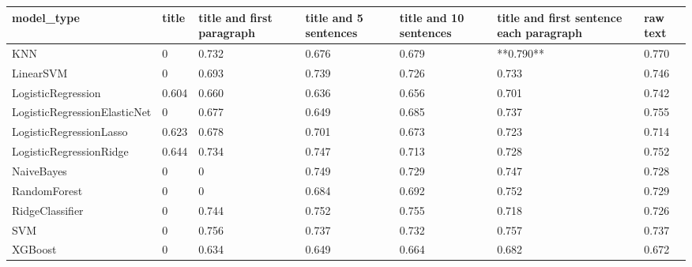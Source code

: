 \begin{tabular}{lllllll}
\toprule
                  model\_type & title & title and first paragraph & title and 5 sentences & title and 10 sentences & title and first sentence each paragraph & raw text \\
\midrule
                         KNN &     0 &                     0.732 &                 0.676 &                  0.679 &                               **0.790** &    0.770 \\
                   LinearSVM &     0 &                     0.693 &                 0.739 &                  0.726 &                                   0.733 &    0.746 \\
          LogisticRegression & 0.604 &                     0.660 &                 0.636 &                  0.656 &                                   0.701 &    0.742 \\
LogisticRegressionElasticNet &     0 &                     0.677 &                 0.649 &                  0.685 &                                   0.737 &    0.755 \\
     LogisticRegressionLasso & 0.623 &                     0.678 &                 0.701 &                  0.673 &                                   0.723 &    0.714 \\
     LogisticRegressionRidge & 0.644 &                     0.734 &                 0.747 &                  0.713 &                                   0.728 &    0.752 \\
                  NaiveBayes &     0 &                         0 &                 0.749 &                  0.729 &                                   0.747 &    0.728 \\
                RandomForest &     0 &                         0 &                 0.684 &                  0.692 &                                   0.752 &    0.729 \\
             RidgeClassifier &     0 &                     0.744 &                 0.752 &                  0.755 &                                   0.718 &    0.726 \\
                         SVM &     0 &                     0.756 &                 0.737 &                  0.732 &                                   0.757 &    0.737 \\
                     XGBoost &     0 &                     0.634 &                 0.649 &                  0.664 &                                   0.682 &    0.672 \\
\bottomrule
\end{tabular}

